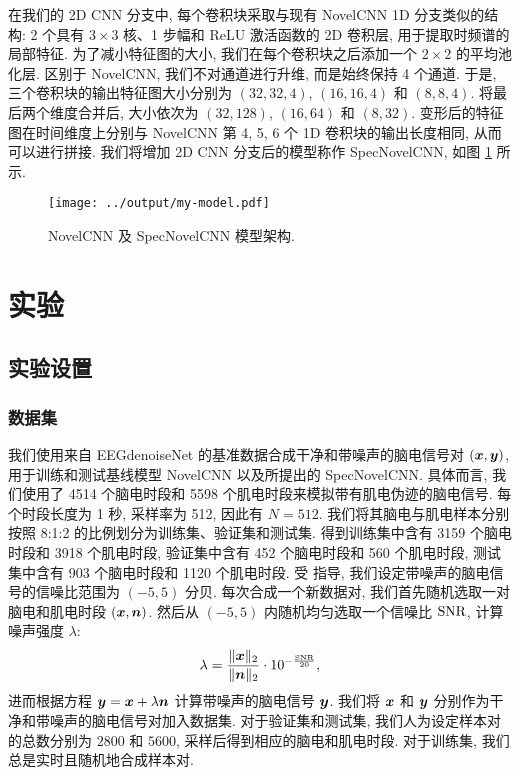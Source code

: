 \documentclass[12pt,a4paper]{article}
\begin{document}
在我们的 2D CNN 分支中, 每个卷积块采取与现有 NovelCNN 1D 分支类似的结构: 2 个具有 $3\times 3$ 核、1 步幅和 ReLU 激活函数的 2D 卷积层, 用于提取时频谱的局部特征. 为了减小特征图的大小, 我们在每个卷积块之后添加一个 $2\times 2$ 的平均池化层. 区别于 NovelCNN, 我们不对通道进行升维, 而是始终保持 4 个通道. 于是, 三个卷积块的输出特征图大小分别为 $(32, 32, 4)$, $(16, 16, 4)$ 和 $(8, 8, 4)$. 将最后两个维度合并后, 大小依次为 $(32, 128)$, $(16, 64)$ 和 $(8, 32)$. 变形后的特征图在时间维度上分别与 NovelCNN 第 4, 5, 6 个 1D 卷积块的输出长度相同, 从而可以进行拼接. 我们将增加 2D CNN 分支后的模型称作 SpecNovelCNN, 如图 \ref{fig:my-model} 所示.

\begin{figure}
    \centering
    \texttt{[image: ../output/my-model.pdf]}
    \caption{NovelCNN 及 SpecNovelCNN 模型架构.}\label{fig:my-model}
\end{figure}

\section{实验}

\subsection{实验设置}

\subsubsection{数据集}

我们使用来自 EEGdenoiseNet \cite{zhang_eegdenoisenet_2021} 的基准数据合成干净和带噪声的脑电信号对 $({\bm{x}},{\bm{y}})$, 用于训练和测试基线模型 NovelCNN 以及所提出的 SpecNovelCNN. 具体而言, 我们使用了 4514 个脑电时段和 5598 个肌电时段来模拟带有肌电伪迹的脑电信号. 每个时段长度为 1 秒, 采样率为 512, 因此有 $N=512$. 我们将其脑电与肌电样本分别按照 8:1:2 的比例划分为训练集、验证集和测试集. 得到训练集中含有 3159 个脑电时段和 3918 个肌电时段, 验证集中含有 452 个脑电时段和 560 个肌电时段, 测试集中含有 903 个脑电时段和 1120 个肌电时段. 受 \cite{cui_dual-branch_2024} 指导, 我们设定带噪声的脑电信号的信噪比范围为 $(-5, 5)$ 分贝. 每次合成一个新数据对, 我们首先随机选取一对脑电和肌电时段 $({\bm{x}}, {\bm{n}})$. 然后从 $(-5,5)$ 内随机均匀选取一个信噪比 ${\rm SNR}$, 计算噪声强度 $\lambda$:
\begin{equation}
    \lambda = \frac{\|{\bm{x}}\|_2}{\|{\bm{n}}\|_2} \cdot 10^{-\frac{\rm SNR}{20}},
\end{equation}
进而根据方程 ${\bm{y}} = {\bm{x}} + \lambda {\bm{n}}$ 计算带噪声的脑电信号 ${\bm{y}}$. 我们将 ${\bm{x}}$ 和 ${\bm{y}}$ 分别作为干净和带噪声的脑电信号对加入数据集. 对于验证集和测试集, 我们人为设定样本对的总数分别为 $2800$ 和 $5600$, 采样后得到相应的脑电和肌电时段. 对于训练集, 我们总是实时且随机地合成样本对.
\end{document}
